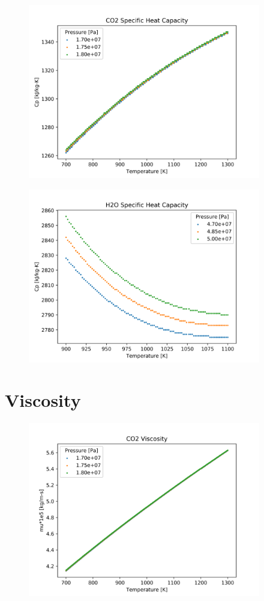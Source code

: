 \begin{figure}[h]
    \centering
    \includegraphics[width=4in]{../images/property_plots/CO2_Specific_Heat_Capacity.png}
\end{figure}

\begin{figure}[h]
    \centering
    \includegraphics[width=4in]{../images/property_plots/H2O_Specific_Heat_Capacity.png}
\end{figure}

\newpage
\section{Viscosity}

\begin{figure}[h]
    \centering
    \includegraphics[width=4in]{../images/property_plots/CO2_Viscosity.png}
\end{figure}

